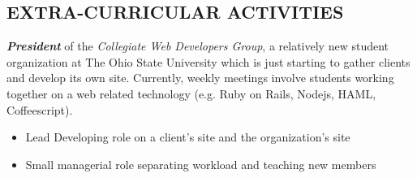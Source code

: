 \documentclass[line,margin=.2,letterpaper]{res}
\begin{document}
\begin{resume}
\section{\uppercase{Extra-Curricular Activities}}             
    \emph{\textbf{President}} of the \emph{Collegiate Web Developers Group}, a relatively new student organization at The Ohio State University which is just starting to gather clients and develop its own site.  Currently, weekly meetings involve students working together on a web related technology (e.g. Ruby on Rails, Nodejs, HAML, Coffeescript).\\
    \vspace{-8pt}
	\begin{itemize}
	    \item Lead Developing role on a client's site and the organization's site
	    \item Small managerial role separating workload and teaching new members
	\end{itemize}
 
\end{resume}
\end{document}
